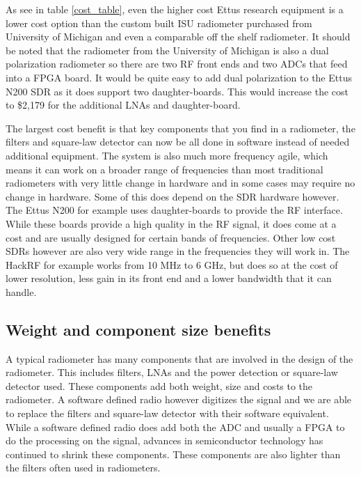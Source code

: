 As see in table \ref{cost_table}, even the higher cost Ettus research equipment is a lower cost option than the custom built ISU radiometer purchased from University of Michigan and even a comparable off the shelf radiometer.  It should be noted that the radiometer from the University of Michigan is also a dual polarization radiometer so there are two RF front ends and two ADCs that feed into a FPGA board.  It would be quite easy to add dual polarization to the Ettus N200 SDR as it does support two daughter-boards.  This would increase the cost to \$2,179 for the additional LNAs and daughter-board.

The largest cost benefit is that key components that you find in a radiometer, the filters and square-law detector can now be all done in software instead of needed additional equipment.  The system is also much more frequency agile, which means it can work on a broader range of frequencies than most traditional radiometers with very little change in hardware and in some cases may require no change in hardware.  Some of this does depend on the SDR hardware however.  The Ettus N200 for example uses daughter-boards to provide the RF interface.  While these boards provide a high quality in the RF signal, it does come at a cost and are usually designed for certain bands of frequencies.  Other low cost SDRs however are also very wide range in the frequencies they will work in.  The HackRF for example works from 10 MHz to 6 GHz, but does so at the cost of lower resolution, less gain in its front end and a lower bandwidth that it can handle.

\subsection{Weight and component size benefits}

A typical radiometer has many components that are involved in the design of the radiometer.  This includes filters, LNAs and the power detection or square-law detector used.  These components add both weight, size and costs to the radiometer.  A software defined radio however digitizes the signal and we are able to replace the filters and square-law detector with their software equivalent.  While a software defined radio does add both the ADC and usually a FPGA to do the processing on the signal, advances in semiconductor technology has continued to shrink these components.  These components are also lighter than the filters often used in radiometers.

